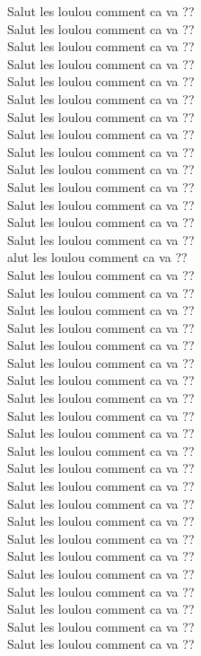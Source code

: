 Salut les loulou comment ca va ??\\
Salut les loulou comment ca va ??\\
Salut les loulou comment ca va ??\\
Salut les loulou comment ca va ??\\
Salut les loulou comment ca va ??\\
Salut les loulou comment ca va ??\\
Salut les loulou comment ca va ??\\
Salut les loulou comment ca va ??\\
Salut les loulou comment ca va ??\\
Salut les loulou comment ca va ??\\
Salut les loulou comment ca va ??\\
Salut les loulou comment ca va ??\\
Salut les loulou comment ca va ??\\
Salut les loulou comment ca va ??\\alut les loulou comment ca va ??\\
Salut les loulou comment ca va ??\\
Salut les loulou comment ca va ??\\
Salut les loulou comment ca va ??\\
Salut les loulou comment ca va ??\\
Salut les loulou comment ca va ??\\
Salut les loulou comment ca va ??\\
Salut les loulou comment ca va ??\\
Salut les loulou comment ca va ??\\
Salut les loulou comment ca va ??\\
Salut les loulou comment ca va ??\\
Salut les loulou comment ca va ??\\
Salut les loulou comment ca va ??\\
Salut les loulou comment ca va ??\\
Salut les loulou comment ca va ??\\
Salut les loulou comment ca va ??\\
Salut les loulou comment ca va ??\\
Salut les loulou comment ca va ??\\
Salut les loulou comment ca va ??\\
Salut les loulou comment ca va ??\\
Salut les loulou comment ca va ??\\
Salut les loulou comment ca va ??\\
Salut les loulou comment ca va ??\\


